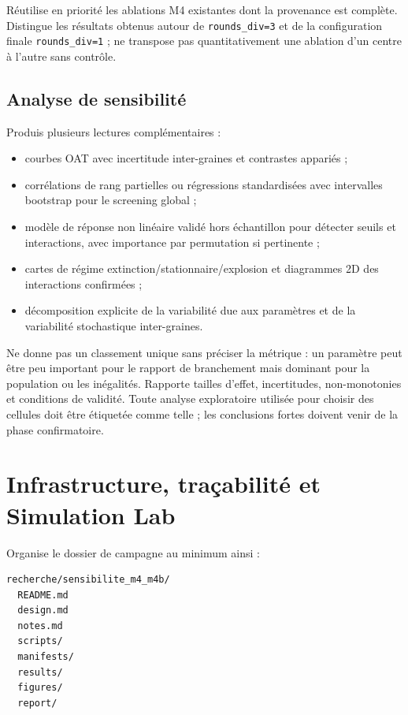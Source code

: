 \documentclass[11pt,a4paper]{article}
\newcommand{\code}[1]{\texttt{\color{navy}#1}}
\begin{document}
Réutilise en priorité les ablations M4 existantes dont la provenance est
complète. Distingue les résultats obtenus autour de \code{rounds\_div=3} et de
la configuration finale \code{rounds\_div=1} ; ne transpose pas
quantitativement une ablation d'un centre à l'autre sans contrôle.

\subsection{Analyse de sensibilité}

Produis plusieurs lectures complémentaires :

\begin{itemize}
  \item courbes OAT avec incertitude inter-graines et contrastes appariés ;
  \item corrélations de rang partielles ou régressions standardisées avec
    intervalles bootstrap pour le screening global ;
  \item modèle de réponse non linéaire validé hors échantillon pour détecter
    seuils et interactions, avec importance par permutation si pertinente ;
  \item cartes de régime extinction/stationnaire/explosion et diagrammes 2D
    des interactions confirmées ;
  \item décomposition explicite de la variabilité due aux paramètres et de la
    variabilité stochastique inter-graines.
\end{itemize}

Ne donne pas un classement unique sans préciser la métrique : un paramètre
peut être peu important pour le rapport de branchement mais dominant pour la
population ou les inégalités. Rapporte tailles d'effet, incertitudes,
non-monotonies et conditions de validité. Toute analyse exploratoire utilisée
pour choisir des cellules doit être étiquetée comme telle ; les conclusions
fortes doivent venir de la phase confirmatoire.

\section{Infrastructure, traçabilité et Simulation Lab}

Organise le dossier de campagne au minimum ainsi :

\begin{verbatim}
recherche/sensibilite_m4_m4b/
  README.md
  design.md
  notes.md
  scripts/
  manifests/
  results/
  figures/
  report/
\end{verbatim}
\end{document}
